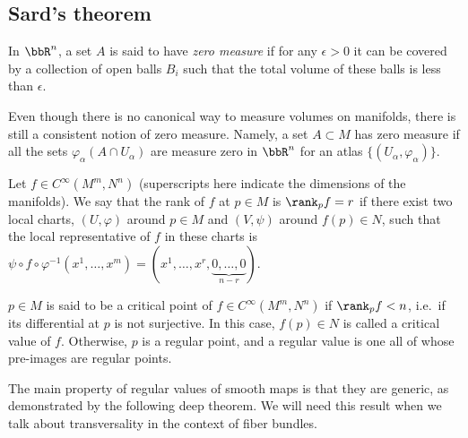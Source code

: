 \subsection{Sard's theorem}

In $\bbR^n$, a set $A$ is said to have\emph{ zero measure} if for any $\epsilon>0$ it can be covered by a collection of open balls $B_i$ such that the total volume of these balls is less than $\epsilon$.

\begin{defn}
    Even though there is no canonical way to measure volumes on manifolds, there is still a consistent notion of zero measure. Namely, a set $A\subset M$ has zero measure if all the sets $\varphi_\alpha(A\cap U_\alpha)$ are measure zero in $\bbR^n$ for an atlas $\{(U_\alpha,\varphi_\alpha)\}$.
\end{defn}

\begin{defn}\label{def.rank}
    Let $f\in C^\infty (M^m,N^n)$ (superscripts here indicate the dimensions of the manifolds). We say that the rank of $f$ at $p\in M$ is $\rank_p f=r$ if there exist two local charts, $(U,\varphi)$ around $p \in M$ and $(V,\psi)$ around $f(p)\in N$, such that the local representative of $f$ in these charts is $\psi\circ f\circ\varphi^{-1}(x^1,\ldots,x^m)=(x^1,\ldots,x^r,\underbrace{0,\ldots,0}_{n-r})$.
\end{defn}

\begin{defn}
    $p\in M$ is said to be a critical point of $f\in C^\infty(M^m,N^n)$ if $\rank_p f<n$, i.e.~if its differential at $p$ is not surjective. In this case, $f(p)\in N$ is called a critical value of $f$. Otherwise, $p$ is a regular point, and a regular value is one all of whose pre-images are regular points.
\end{defn}

The main property of regular values of smooth maps is that they are generic, as demonstrated by the following deep theorem. We will need this result when we talk about transversality in the context of fiber bundles.

